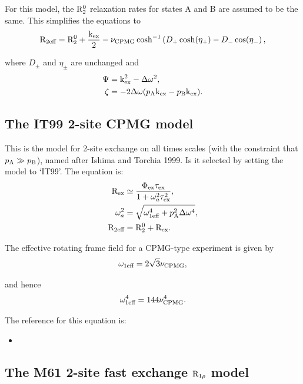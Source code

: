 For this model, the $\mathrm{R}_2^0$ relaxation rates for states A and B are assumed to be the same.  This simplifies the equations to
\begin{equation}
    \mathrm{R}_{2\textrm{eff}} = \mathrm{R}_2^0 + \frac{\textrm{k}_\textrm{ex}}{2} - \nu_\textrm{CPMG}\cosh^{-1} \left( D_+\cosh(\eta_+) - D_-\cos(\eta_- \right) ,
\end{equation}

where $D_\pm$ and $\eta_\pm$ are unchanged and
\begin{align}
    \Psi  &= \textrm{k}_\textrm{ex}^2 - \Delta\omega^2 , \\
    \zeta &= -2\Delta\omega (p_\textrm{A}\textrm{k}_\textrm{ex} - p_\textrm{B}\textrm{k}_\textrm{ex}) .
\end{align}




\subsection{The IT99 2-site CPMG model}

This is the model for 2-site exchange on all times scales (with the constraint that $p_\textrm{A} \gg p_\textrm{B}$), named after Ishima and Torchia 1999.  Is it selected by setting the model to `IT99'.  The equation is:
\begin{align}
    \mathrm{R}_\textrm{ex}       &\simeq \frac{\Phi_\textrm{ex}\tau_\textrm{ex}}{1 + \omega_a^2\tau_\textrm{ex}^2} , \\
    \omega_a^2 &= \sqrt{\omega_\textrm{1eff}^4 + p_\textrm{A}^2\Delta\omega^4} , \\
    \mathrm{R}_{2\textrm{eff}}   &= \mathrm{R}_2^0 + \mathrm{R}_\textrm{ex} .
\end{align}

The effective rotating frame field for a CPMG-type experiment is given by
\begin{equation}
    \omega_\textrm{1eff} = 2\sqrt{3}\nu_\textrm{CPMG} ,
\end{equation}

and hence
\begin{equation}
    \omega_\textrm{1eff}^4 = 144\nu_\textrm{CPMG}^4 .
\end{equation}

The reference for this equation is:
\begin{itemize}
\item {}
\end{itemize}



\subsection{The M61 2-site fast exchange $\mathrm{R}_{1\rho}$ model}

